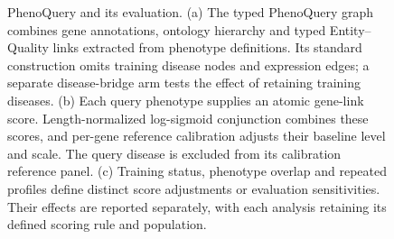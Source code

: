 \begin{figure}[t]
\caption{PhenoQuery and its evaluation.
(a) The typed PhenoQuery graph combines gene annotations, ontology hierarchy
and typed Entity--Quality links extracted from phenotype definitions. Its
standard construction omits training disease nodes and expression edges;
a separate disease-bridge arm tests the effect of retaining training diseases.
(b) Each query phenotype supplies an atomic gene-link score. Length-normalized
log-sigmoid conjunction combines these scores, and per-gene reference
calibration adjusts their baseline level and scale. The query disease is
excluded from its calibration reference panel.
(c) Training status, phenotype overlap and repeated profiles define distinct
score adjustments or evaluation sensitivities. Their effects are reported
separately, with each analysis retaining its defined scoring rule and population.}
\label{fig:phenoquery}
\end{figure}
